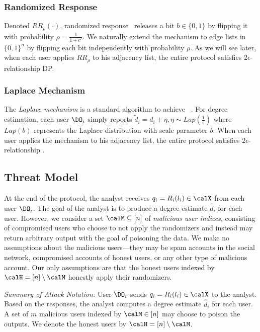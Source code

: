 \subsubsection{Randomized Response} Denoted $RR_\rho(\cdot)$, randomized response~\cite{RR} releases a bit $b \in \{0,1\}$ by
flipping it with probability $\rho = \frac{1}{1+e^\epsilon}$. We naturally extend the mechanism to edge lists in $\{0,1\}^n$ by flipping each bit independently with probability $\rho$.
As we will see later, when each user applies $RR_\rho$ to his adjacency list, the entire protocol satisfies $2\epsilon$-relationship DP.

\subsubsection{Laplace Mechanism} 
The \textit{Laplace mechanism} is a standard algorithm to achieve \DP~\cite{Dwork}. For degree estimation, each user $\DO_i$ simply reports $\tilde{d}_i=d_i+\eta, \eta \sim Lap(\frac{1}{\epsilon})$ where $Lap(b)$ represents the Laplace distribution with scale parameter $b$. When each user applies the mechanism to his adjacency list, the entire protocol satisfies $2\epsilon$-relationship \DP. 



\subsection{Threat Model}
At the end of the protocol, the analyst receives $q_i = R_i(l_i) \in \calX$ from each user $\DO_i$. The goal of the analyst is to produce a degree estimate $\hat{d}_i$ for each user. However, we consider a set $\calM \subseteq [n]$ of \emph{malicious user indices}, consisting of compromised users who choose to not apply the randomizers and instead may return arbitrary output with the goal of poisoning the data. We make no assumptions about the malicious users---they may be spam accounts in the social network, compromised accounts of honest users, or any other type of malicious account. Our only assumptions are that the honest users indexed by $\calH = [n] \setminus \calM$ honestly apply their randomizers.



\textit{Summary of Attack Notation:}
User $\DO_i$ sends $q_i = R_i(l_i) \in \calX$ to the analyst. Based on the responses, the analyst computes a degree estimate $\hat{d}_i$ for each user. A set of $m$ malicious users indexed by $\calM \in [n]$ may choose to poison the outputs. We denote the honest users by $\calH = [n] \setminus \calM$.



